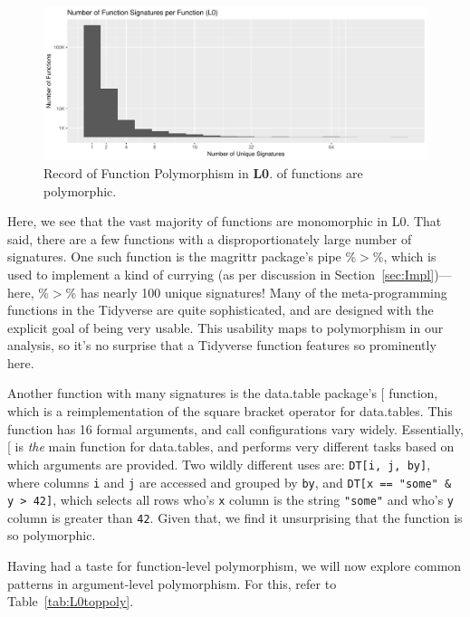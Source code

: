 \documentclass[acmsmall,10pt,review,anonymous]{acmart}\settopmatter{printfolios=true,printccs=false,printacmref=false}
\newcommand{\code}[1]{\lstinline|#1|\xspace}
\begin{document}
\begin{figure}[htbp]\begin{center}
\includegraphics[width=.9\textwidth]{L0_by_fun}
\caption{Record of Function Polymorphism in {\bf L0}. \LZEROPERCPOLY of functions are polymorphic.}
\label{fig:L0funcounts}\end{center}
\end{figure}

Here, we see that the vast majority of functions are monomorphic in L0.
That said, there are a few functions with a disproportionately large number of signatures.
One such function is the magrittr package's pipe \%$>$\%, which is used to implement a kind of currying (as per discussion in Section~\ref{sec:Impl})---here, \%$>$\% has nearly 100 unique signatures!
Many of the meta-programming functions in the Tidyverse are quite sophisticated, and are designed with the explicit goal of being very usable.
This usability maps to polymorphism in our analysis, so it's no surprise that a Tidyverse function features so prominently here.

Another function with many signatures is the data.table package's [ function, which is a reimplementation of the square bracket operator for data.tables.
This function has 16 formal arguments, and call configurations vary widely.
Essentially, [ is {\it the} main function for data.tables, and performs very different tasks based on which arguments are provided.
Two wildly different uses are:
\code{DT[i, j, by]}, where columns \code{i} and \code{j} are accessed and grouped by \code{by}, and \code{DT[x == "some" & y > 42]}, which selects all rows who's \code{x} column is the string \code{"some"} and who's \code{y} column is greater than \code{42}.
Given that, we find it unsurprising that the function is so polymorphic.

Having had a taste for function-level polymorphism, we will now explore common patterns in argument-level polymorphism.
For this, refer to Table~\ref{tab:L0toppoly}.
\end{document}
